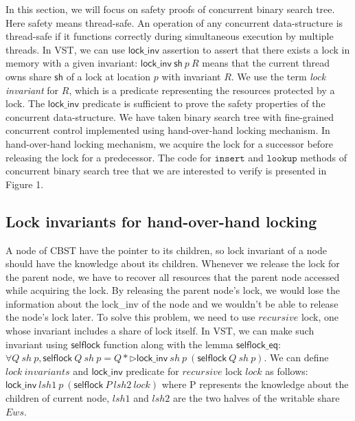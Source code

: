 \documentclass[11pt]{article} %
\begin{document}
In this section, we will focus on safety proofs of concurrent binary search tree. Here safety means thread-safe. An operation of any concurrent data-structure is thread-safe if it functions correctly during simultaneous execution by multiple threads. In VST, we can use $\mathsf{lock\_inv}$ assertion to assert that there exists a lock in memory with a given invariant: $\mathsf{lock\_inv}\ \mathsf{sh}\ p\ R$ means that the current thread owns share $\mathsf{sh}$ of a lock at location $p$ with invariant $R$. We use the term \emph{lock invariant} for $R$, which is a predicate representing the resources protected by a lock. The $\mathsf{lock\_inv}$ predicate is sufficient to prove the safety properties of the concurrent data-structure. We have taken binary search tree with fine-grained concurrent control implemented using hand-over-hand locking mechanism. In hand-over-hand locking mechanism, we acquire the lock for a successor before releasing the lock for a predecessor. The code for $\texttt{insert}$ and $\texttt{lookup}$ methods of concurrent binary search tree that we are interested to verify is presented in Figure 1. 



 

   
\subsection{Lock invariants for hand-over-hand locking}
A node of CBST have the pointer to its children, so lock invariant of a node should have the knowledge about its children.   
Whenever we release the lock for the parent node, we have to recover all resources that the parent node accessed while acquiring the lock. By releasing the parent node's lock, we would lose the information about the lock\_inv of the node and we wouldn't be able to release the node's lock later. To solve this problem, we need to use $recursive$ lock, one whose invariant includes a share of lock itself. In VST, we can make such invariant using $\mathsf{selflock}$ function along with the lemma $\mathsf{selflock\_eq}$: $\forall Q\ \mathit{sh}\ p, \mathsf{selflock}\ Q\ \mathit{sh}\ p = Q * \triangleright \mathsf{lock\_inv}\ \mathit{sh}\ p\ (\mathsf{selflock}\ Q\ \mathit{sh}\ p)$. We can define $lock\ invariants$ and $\mathsf{lock\_inv}$ predicate for $recursive$ lock $lock$ as follows: $\mathsf{lock\_inv}\ lsh1\ p\ (\mathsf{selflock}\ P\ lsh2\ lock)$ where P represents the knowledge about the children of current node, $lsh1$ and $lsh2$ are the two halves of the writable share $Ews$.
\end{document}
